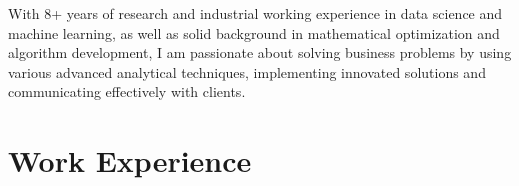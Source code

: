 \documentclass[11pt,a4paper,sans]{moderncv}        %
\begin{document}
\makecvtitle
\vspace*{-8mm}
\small{With 8+ years of research and industrial working experience in data science and machine learning, as well as solid background in mathematical optimization and algorithm development, I am passionate about solving business problems by using various advanced analytical techniques, implementing innovated solutions and communicating effectively with clients.}

\section{Work Experience}

\vspace{6pt}
\end{document}
